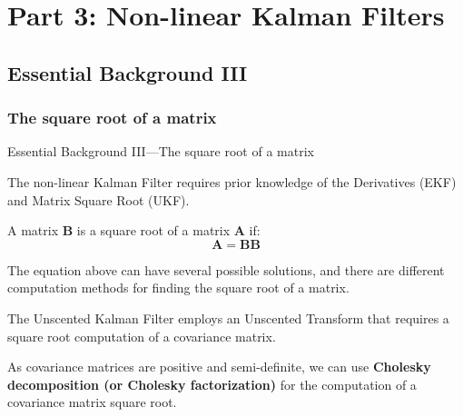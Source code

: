 \section{Part 3: Non-linear Kalman Filters}
\subsection{Essential Background III}

\subsubsection{The square root of a matrix}
\begin{frame}{Essential Background III---The square root of a matrix}

The non-linear Kalman Filter requires prior knowledge of the Derivatives (EKF) and Matrix Square Root (UKF).

\vspace{10pt}
A matrix \(\mathbf{B}\) is a square root of a matrix \(\mathbf{A}\) if:
\[
\mathbf{A} = \mathbf{B}\mathbf{B} 
\]

The equation above can have several possible solutions, and there are different computation methods for finding the square root of a matrix.

\vspace{10pt}
The Unscented Kalman Filter employs an Unscented Transform that requires a square root computation of a covariance matrix. 

\vspace{10pt}
As covariance matrices are positive and semi-definite, we can use \textbf{Cholesky decomposition (or Cholesky factorization)} for the computation of a covariance matrix square root.

\end{frame}

